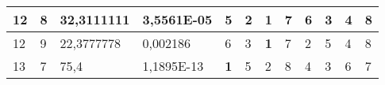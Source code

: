 \documentclass[conference]{IEEEtran}
\begin{document}
\begin{table*}[]
\begin{tabular}{|llll|llllllll|}
\multicolumn{1}{|l|}{12}                                                    & \multicolumn{1}{l|}{8}                                                        & \multicolumn{1}{l|}{32,3111111}                                                   & 3,5561E-05                     & \multicolumn{1}{l|}{5}                                                  & \multicolumn{1}{l|}{2}                                                  & \multicolumn{1}{l|}{\textbf{1}}                                         & \multicolumn{1}{l|}{7}                                                  & \multicolumn{1}{l|}{6}                                                  & \multicolumn{1}{l|}{3}                                                  & \multicolumn{1}{l|}{4}                                                  & 8                          \\ \hline
\multicolumn{1}{|l|}{12}                                                    & \multicolumn{1}{l|}{9}                                                        & \multicolumn{1}{l|}{22,3777778}                                                   & 0,002186                       & \multicolumn{1}{l|}{6}                                                  & \multicolumn{1}{l|}{3}                                                  & \multicolumn{1}{l|}{\textbf{1}}                                         & \multicolumn{1}{l|}{7}                                                  & \multicolumn{1}{l|}{2}                                                  & \multicolumn{1}{l|}{5}                                                  & \multicolumn{1}{l|}{4}                                                  & 8                          \\ \hline
\multicolumn{1}{|l|}{13}                                                    & \multicolumn{1}{l|}{7}                                                        & \multicolumn{1}{l|}{75,4}                                                         & 1,1895E-13                     & \multicolumn{1}{l|}{\textbf{1}}                                         & \multicolumn{1}{l|}{5}                                                  & \multicolumn{1}{l|}{2}                                                  & \multicolumn{1}{l|}{8}                                                  & \multicolumn{1}{l|}{4}                                                  & \multicolumn{1}{l|}{3}                                                  & \multicolumn{1}{l|}{6}                                                  & 7                          \\ \hline

\end{tabular}
\end{table*}
\end{document}
